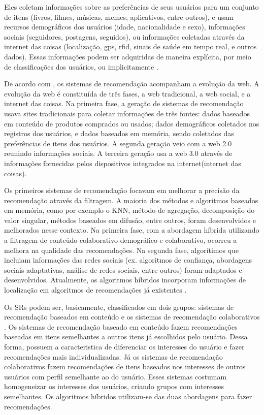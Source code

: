 Eles coletam informações sobre as preferências 
de seus usuários para um conjunto de itens (livros, filmes, músicas, 
memes, aplicativos, entre outros), e usam recursos demográficos dos 
usuários (idade, nacionalidade e sexo), informações sociais 
(seguidores, postagens, seguidos), ou informações coletadas através da 
internet das coisas (localização, gps, rfid, sinais de saúde em tempo 
real, e outros dados). Essas informações podem ser adquiridas de maneira 
explícita, por meio de classificações dos usuários, ou implicitamente 
\cite{bobadilla2013}.

De acordo com , os sistemas de recomendação 
acompanham a evolução da web. A evolução da web é constituída de três 
fases, a web tradicional, a web social, e a internet das coisas. 
Na primeira fase, a geração de sistemas de recomendação usava 
sites tradicionais para coletar informações de três fontes: dados 
baseados em conteúdo de produtos comprados ou usados; dados 
demográficos coletados nos registros dos usuários, e dados baseados em 
memória, sendo coletados das preferências de itens dos usuários. A segunda 
geração veio com a web 2.0 reunindo informações sociais. A terceira 
geração usa a web 3.0 através de informações fornecidas pelos dispositivos 
integrados na internet(internet das coisas).

Os primeiros sistemas de recomendação focavam em melhorar a precisão da 
recomendação através da filtragem. A maioria dos métodos e algoritmos 
baseados em memória, como por exemplo o KNN, método de agregação, decomposição do valor 
singular, métodos baseados em difusão, entre outros, foram
desenvolvidos e melhorados nesse contexto. Na primeira fase, com a 
abordagem híbrida utilizando a filtragem de conteúdo 
colaborativo-demográfico e colaborativo, ocorreu a melhora na qualidade 
das recomendações. Na segunda fase, algorítimos que incluiam informações 
das redes sociais (ex. algoritmos de
confiança, abordagens sociais adaptativas, análise de redes sociais, 
entre outros) foram adaptados e 
desenvolvidos. Atualmente, os algoritmos híbridos incorporam informações 
de localização em algoritmos de recomendações já existentes \cite{bobadilla2013}. 

Os SRs podem ser, basicamente, classificados em dois grupos: sistemas de recomendação baseados	
em conteúdo e os sistemas de recomendação colaborativos \cite{mauricio}. Os sistemas
de recomendação baseado em conteúdo fazem recomendações baseadas em itens semelhantes
a outros itens já escolhidos pelo usuário. Dessa forma, possuem a caracteristica de
diferenciar os interesses do usuário e fazer recomendações mais individualizadas. Já os 
sistemas de recomendação colaborativos fazem recomendações de itens baseados nos interesses 
de outros usuários com perfil semelhante ao do usuário. Esses sistemas costumam homogeneizar
os interesses dos usuários, criando grupos com interesses semelhantes. Os algoritmos híbridos 
utilizam-se das duas abordagens para fazer recomendações.


